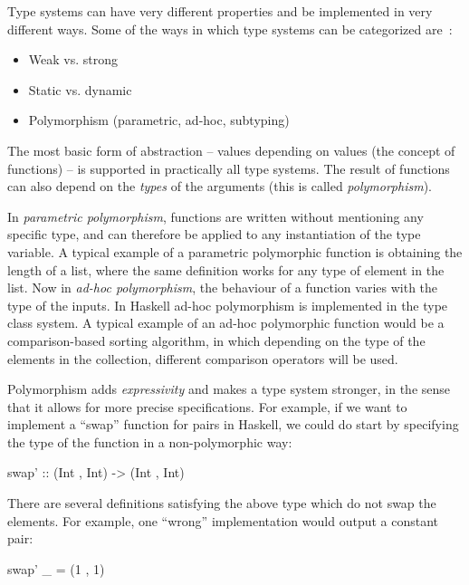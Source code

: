             Type systems can have very different properties and be implemented in very different ways.
            Some of the ways in which type systems can be categorized are~\cite{understanding-types-cardelli}:

            \begin{itemize}
                \item Weak vs. strong
                \item Static vs. dynamic
                \item Polymorphism (parametric, ad-hoc, subtyping)
            \end{itemize}

            The most basic form of abstraction -- values depending on values (the concept of functions) -- is
            supported in practically all type systems.
            The result of functions can also depend on the \emph{types} of the arguments
            (this is called \emph{polymorphism}).

            In \emph{parametric polymorphism}, functions are written without mentioning any specific type,
            and can therefore be applied to any instantiation of the type variable.
            A typical example of a parametric polymorphic function is obtaining the length of a list,
            where the same definition works for any type of element in the list.
            Now in \emph{ad-hoc polymorphism}, the behaviour of a function varies with the type of the inputs.
            In Haskell ad-hoc polymorphism is implemented in the type class system.
            A typical example of an ad-hoc polymorphic function would be a comparison-based sorting algorithm,
            in which depending on the type of the elements in the collection,
            different comparison operators will be used.

            Polymorphism adds \emph{expressivity} and makes a type system stronger,
            in the sense that it allows for more precise specifications.
            For example, if we want to implement a ``swap'' function for pairs in Haskell,
            we could do start by specifying the type of the function in a non-polymorphic way:
            \begin{haskellcode}
        swap' :: (Int , Int) -> (Int , Int)
            \end{haskellcode}

            There are several definitions satisfying the above type which do not swap the elements.
            For example, one ``wrong'' implementation would output a constant pair:
            \begin{haskellcode}
        swap' _ = (1 , 1)
            \end{haskellcode}

